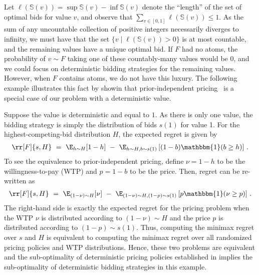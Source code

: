 Let $\ell(\mathbb S(v)) = \sup \mathbb S(v) - \inf \mathbb S(v)$ denote the ``length'' of the set of optimal bids for value $v$, and observe that $\sum_{v \in [0,1]} \ell(\mathbb S(v)) \leq 1$. As the sum of any uncountable collection of positive integers necessarily diverges to infinity, we must have that the set $\{ v \mid \ell(\mathbb S(v))> 0\}$ is at most countable, and the remaining values have a unique optimal bid. If $F$ had no atoms, the probability of $v \sim F$ taking one of these countably-many values would be 0, and we could focus on deterministic bidding strategies for the remaining values. However, when $F$ contains atoms, we do not have this luxury. The following example illustrates this fact by showin that prior-independent pricing~\citep{bergemann2011robust} is a special case of our problem with a deterministic value.
\begin{example}\label{example:atom-at-1}
	Suppose the value is deterministic and equal to $1$. As there is only one value, the bidding strategy is simply the distribution of bids  $s(1)$ for value 1. For the highest-competing-bid distribution $H$, the expected regret is given by
    \begin{align*}
        \rr[F]{s, H}\ =\ \E_{h \sim H}[1 - h]\ -\ \E_{h \sim H, b \sim s(1)}\left[ (1 - b) \mathbbm{1}(b \geq h)\right]\,. 
    \end{align*}
    To see the equivalence to prior-independent pricing, define $\nu = 1-h$ to be the willingness-to-pay (WTP) and $p = 1 - b$ to be the price. Then, regret can be re-written as
    \begin{align*}
         \rr[F]{s, H}\ =\ \E_{(1- \nu) \sim H}[\nu]\ -\ \E_{(1 -\nu) \sim H, (1 -p) \sim s(1)}\left[ p \mathbbm{1}(\nu \geq p)\right]\,.
    \end{align*}
    The right-hand side is exactly the expected regret for the pricing problem when the WTP $\nu$ is distributed according to $(1 - \nu) \sim H$ and the price $p$ is distributed according to $(1 - p) \sim s(1)$. Thus, computing the minimax regret over $s$ and $H$ is equivalent to computing the minimax regret over all randomized pricing policies and WTP distributions. Hence, these two problems are equivalent and the sub-optimality of deterministic pricing policies established in \citet{bergemann2011robust} implies the sub-optimality of deterministic bidding strategies in this example. 
\end{example}

